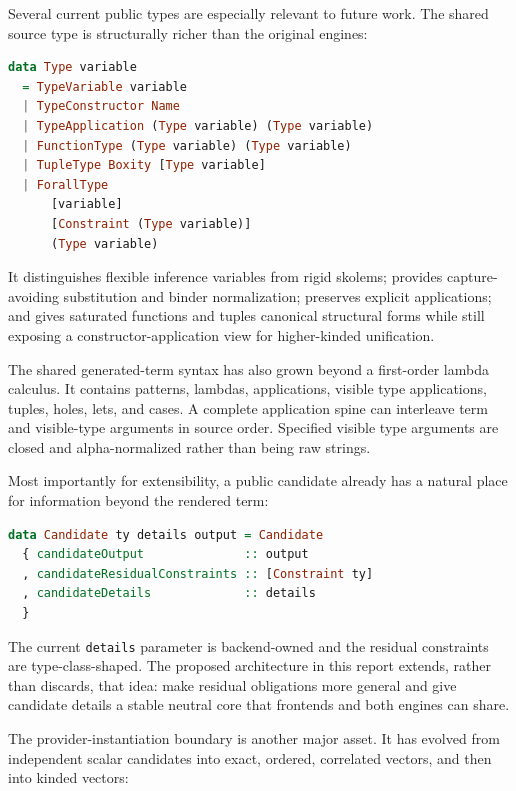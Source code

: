 \documentclass[11pt]{article}
\newcommand{\code}[1]{\texttt{#1}}
\begin{document}
Several current public types are especially relevant to future work.
The shared source type is structurally richer than the original engines:

\begin{lstlisting}[language=Haskell,caption={Current shared source-type shape (abridged).}]
data Type variable
  = TypeVariable variable
  | TypeConstructor Name
  | TypeApplication (Type variable) (Type variable)
  | FunctionType (Type variable) (Type variable)
  | TupleType Boxity [Type variable]
  | ForallType
      [variable]
      [Constraint (Type variable)]
      (Type variable)
\end{lstlisting}

It distinguishes flexible inference variables from rigid skolems; provides
capture-avoiding substitution and binder normalization; preserves explicit
applications; and gives saturated functions and tuples canonical structural
forms while still exposing a constructor-application view for higher-kinded
unification.

The shared generated-term syntax has also grown beyond a first-order lambda
calculus.  It contains patterns, lambdas, applications, visible type
applications, tuples, holes, lets, and cases.  A complete application spine can
interleave term and visible-type arguments in source order.  Specified visible
type arguments are closed and alpha-normalized rather than being raw strings.

Most importantly for extensibility, a public candidate already has a natural
place for information beyond the rendered term:

\begin{lstlisting}[language=Haskell,caption={The existing candidate envelope is an opening for a richer protocol.}]
data Candidate ty details output = Candidate
  { candidateOutput              :: output
  , candidateResidualConstraints :: [Constraint ty]
  , candidateDetails             :: details
  }
\end{lstlisting}

The current \code{details} parameter is backend-owned and the residual
constraints are type-class-shaped.  The proposed architecture in this report
extends, rather than discards, that idea: make residual obligations more
general and give candidate details a stable neutral core that frontends and
both engines can share.

The provider-instantiation boundary is another major asset.  It has evolved
from independent scalar candidates into exact, ordered, correlated vectors,
and then into kinded vectors:
\end{document}

